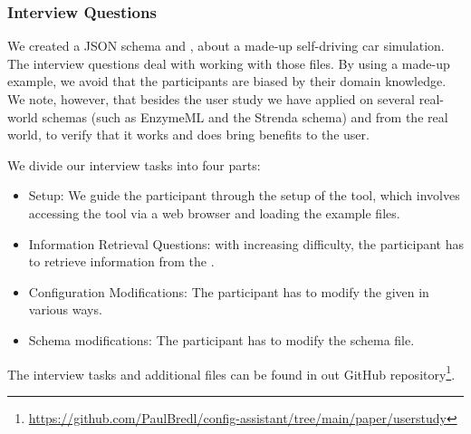 \subsubsection{Interview Questions}
We created a JSON schema and \cfgfile{}, about a made-up self-driving car simulation.
The interview questions deal with working with those files.
By using a made-up example, we avoid that the participants are biased by their domain knowledge.
We note, however, that besides the user study we have applied \toolname{} on several real-world schemas (such as EnzymeML\cite{pyenzyme} and the Strenda schema\cite{strenda}) and \cfgfiles{} from the real world, to verify that it works and does bring benefits to the user.

We divide our interview tasks into four parts:
\begin{itemize}
    \item Setup: We guide the participant through the setup of the tool, which involves accessing the tool via a web browser and loading the example files.
    \item Information Retrieval Questions: with increasing difficulty, the participant has to retrieve information from the \cfgfile{}.
    \item Configuration Modifications: The participant has to modify the given \cfgfile{} in various ways.
    \item Schema modifications: The participant has to modify the schema file.
\end{itemize}

The interview tasks and additional files can be found in out GitHub repository\footnote{\url{https://github.com/PaulBredl/config-assistant/tree/main/paper/userstudy}}.

